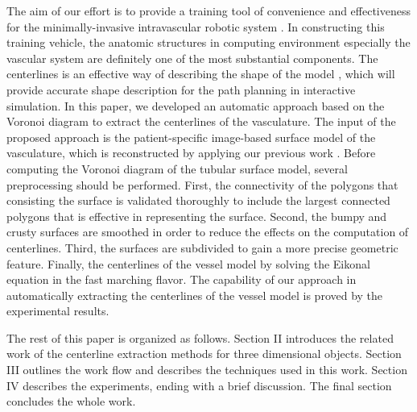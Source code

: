 The aim of our effort is to provide a training tool of convenience and effectiveness for the minimally-invasive intravascular robotic system \cite{Ji2011EMBC}.
In constructing this training vehicle, the anatomic structures in computing environment especially the vascular system are definitely one of the most substantial components.
The centerlines is an effective way of describing the shape of the model \cite{Ogniewicz1995}, which will provide accurate shape description for the path planning in interactive simulation.
In this paper, we developed an automatic approach based on the Voronoi diagram \cite{Antiga2003} to extract the centerlines of the vasculature.
The input of the proposed approach is the patient-specific image-based surface model of the vasculature, which is reconstructed by applying our previous work \cite{Yang2014ICRA}. %
Before computing the Voronoi diagram of the tubular surface model, several preprocessing should be performed.
First, the connectivity of the polygons that consisting the surface is validated thoroughly to include the largest connected polygons that is effective in representing the surface. %
Second, the bumpy and crusty surfaces are smoothed in order to reduce the effects on the computation of centerlines.
Third, the surfaces are subdivided to gain a more precise geometric feature.
Finally, the centerlines of the vessel model by solving the Eikonal equation in the fast marching flavor.
The capability of our approach in automatically extracting the centerlines of the vessel model is proved by the experimental results.

The rest of this paper is organized as follows.
Section II introduces the related work of the centerline extraction methods for three dimensional objects.
Section III outlines the work flow and describes the techniques used in this work.
Section IV describes the experiments, ending with a brief discussion.
The final section concludes the whole work. 